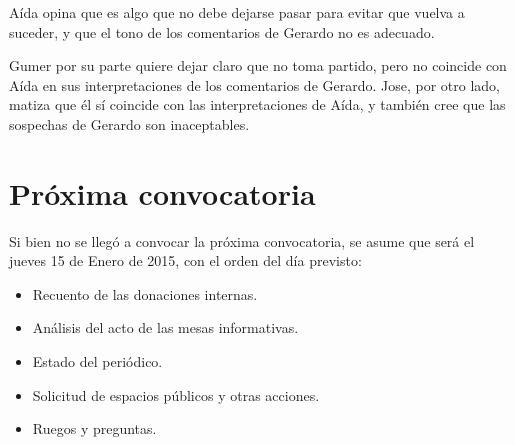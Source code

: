 \documentclass[11pt]{article}
\begin{document}
Aída opina que es algo que no debe dejarse pasar para evitar que vuelva a suceder, y que el tono de los comentarios de Gerardo no es adecuado.

Gumer por su parte quiere dejar claro que no toma partido, pero no coincide con Aída en sus interpretaciones de los comentarios de Gerardo.
Jose, por otro lado, matiza que él sí coincide con las interpretaciones de Aída, y también cree que las sospechas de Gerardo son inaceptables.

\section{Próxima convocatoria}
\label{sec-8}

Si bien no se llegó a convocar la próxima convocatoria, se asume que será el jueves 15 de Enero de 2015, con el orden del día previsto:

\begin{itemize}
\item Recuento de las donaciones internas.
\item Análisis del acto de las mesas informativas.
\item Estado del periódico.
\item Solicitud de espacios públicos y otras acciones.
\item Ruegos y preguntas.
\end{itemize}
\end{document}

